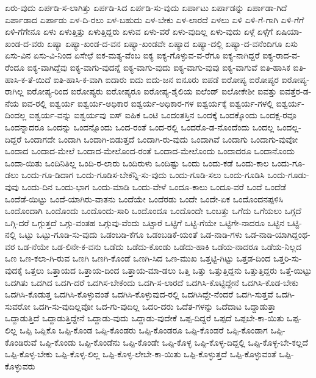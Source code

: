 {ಏರು-ವುದು
ಏರ್ಪಡಿ-ಸ-ಲಾಗಿತ್ತು
ಏರ್ಪಡಿ-ಸಿದ
ಏರ್ಪಡಿ-ಸು-ವುದು
ಏರ್ಪಾಟು
ಏರ್ಪಾಡನ್ನು
ಏರ್ಪಾಡಾ-ಗಿದೆ
ಏರ್ಪಾಡಾದ
ಏರ್ಪಾಡು
ಏಳ-ದಿ-ರಲು
ಏಳ-ಬಹುದು
ಏಳ-ಬೇಕು
ಏಳ-ಲಾರದೆ
ಏಳಲು
ಏಳಿ
ಏಳಿ-ಗೆ-ಗಾಗಿ
ಏಳಿ-ಗೆಗೆ
ಏಳಿ-ಗೆಗೇನೂ
ಏಳು
ಏಳುತ್ತಿತ್ತು
ಏಳುತ್ತಿದ್ದರು
ಏಳುವ
ಏಳು-ವರೆ
ಏಳು-ವುದಿಲ್ಲ
ಏಳು-ವುದು
ಏಳ್ಗೆ
ಏಳ್ಗೆಗೆ
ಏಷಿಯಾ-ಖಂಡ-ದ-ವರು
ಏಷ್ಯಾ
ಏಷ್ಯಾ-ಖಂಡ-ದ-ವನ
ಏಷ್ಯಾ-ಖಂಡವೇ
ಏಷ್ಯಾದ
ಏಷ್ಯಾ-ದಲ್ಲಿ
ಏಷ್ಯಾ-ದ-ವನೆಂದಿಗೂ
ಏಸು
ಏಸು-ವಿನ
ಏಸು-ವಿ-ನಿಂದ
ಏಸೇಛೆ
ಐಕ-ಮತ್ಯ-ವೆಂಬ
ಐಕ್ಯ
ಐಕ್ಯ-ಗೊಳ್ಳುವ-ವ-ರೆಗೂ
ಐಕ್ಯ-ನಾಗಿದ್ದರೆ
ಐಕ್ಯ-ರಾದ-ವ-ರೆಂದೂ
ಐಕ್ಯ-ವಾಗಿದ್ದೆವು
ಐಕ್ಯ-ವಾಗು-ವುದನ್ನೆ
ಐಕ್ಯ-ವಾಗು-ವುದು
ಐಕ್ಯ-ವಾಗು-ವುವು
ಐಕ್ಯ-ವಾಗುವೆ
ಐತಿ-ಹಾಸಿಕ
ಐತಿ-ಹಾಸಿ-ಕ-ತೆ-ಯಿದೆ
ಐತಿ-ಹಾಸಿ-ಕ-ವಾಗಿ
ಐದಾರು
ಐದು
ಐದು-ಜನ
ಐನೂರು
ಐಪಡೆ
ಐರೋಪ್ಯ
ಐರೋಪ್ಯರ
ಐರೋಪ್ಯ-ರಾಗಿಲ್ಲ
ಐರೋಪ್ಯ-ರಿಂದ
ಐರೋಪ್ಯರು
ಐರೋಪ್ಯರೂ
ಐರೋಪ್ಯ-ಶೈಲಿಯ
ಐಲೆಂಡ್
ಐಲೋಕೇಶೀ
ಐವತ್ತು
ಐವತ್ತೆರ-ಡ-ನೆಯ
ಐವ-ರಲ್ಲಿ
ಐಶ್ವರ್ಯ
ಐಶ್ವರ್ಯ-ಅಧಿಕಾರ
ಐಶ್ವರ್ಯ-ಅಧಿಕಾರ-ಗಳ
ಐಶ್ವರ್ಯಕ್ಕೆ
ಐಶ್ವರ್ಯ-ಗಳಲ್ಲಿ
ಐಶ್ವರ್ಯ-ದಿಂದಲ್ಲ
ಐಶ್ವರ್ಯ-ವನ್ನು
ಐಶ್ವರ್ಯವು
ಐಸ್
ಐಹಿಕ
ಒಂಟಿ
ಒಂದಂತಸ್ತಿನ
ಒಂದಕ್ಕೆ
ಒಂದಕ್ಕೊಂದು
ಒಂದಕ್ಷ-ರವೂ
ಒಂದನ್ನಾದರೂ
ಒಂದನ್ನು
ಒಂದನ್ನೊಂದು
ಒಂದ-ರಂತೆ
ಒಂದ-ರಲ್ಲಿ
ಒಂದರೊ-ಡ-ನೊಂದೆಂದು
ಒಂದಲ್ಲ
ಒಂದಲ್ಲ-ದಿದ್ದರೆ
ಒಂದಾಗದೇ
ಒಂದಾಗಿ
ಒಂದಾಗಿ-ಬಿಡುತ್ತದೆ
ಒಂದಾಗಿ-ರು-ವುದು
ಒಂದಾಗಿವೆ
ಒಂದಾಗು
ಒಂದಾಗು-ವುವೋ
ಒಂದಾದ
ಒಂದಾದ-ಮೇಲೆ
ಒಂದಾದ-ಮೇಲೊಂದ-ರಂತೆ
ಒಂದಾದ-ಮೇಲೊಂದು
ಒಂದಾದರೂ
ಒಂದಾನೊಂದು
ಒಂದಾ-ಯಿತು
ಒಂದಿನಿತಿಲ್ಲ
ಒಂದಿ-ರ-ಲಾರು
ಒಂದಿರುಳು
ಒಂದಿಷ್ಟು
ಒಂದು
ಒಂದು-ಕಡೆ
ಒಂದು-ಕಾಲ
ಒಂದು-ಗೂ-ಡಲು
ಒಂದು-ಗೂ-ಡಿದಾಗ
ಒಂದು-ಗೂಡಿಸ-ಬೇಕೆನ್ನಿ-ಸು-ವುದು
ಒಂದು-ಗೂಡಿ-ಸಲು
ಒಂದು-ಗೂಡಿಸಿ
ಒಂದು-ಗೂಡು-ವುವು
ಒಂದು-ದಿನ
ಒಂದು-ಭಾಗ
ಒಂದು-ಮಾಡಿ
ಒಂದು-ವೇಳೆ
ಒಂದೂ-ಕಾಲು
ಒಂದೂ-ವರೆ
ಒಂದೆ
ಒಂದೆಡೆ
ಒಂದೆಡೆ-ಯಿಟ್ಟು
ಒಂದೆ-ಯಾಗಿರು-ವಾತನು
ಒಂದೆಯೇ
ಒಂದೆರಡು
ಒಂದೇ
ಒಂದೇ-ಏಕ
ಒಂದೊಂದನಪ್ಪಳಿಸಿ
ಒಂದೊಂದಾಗಿ
ಒಂದೊಂದು
ಒಂದೊಂದು-ಸಾರಿ
ಒಂದೊಂದೂ
ಒಂದೊಂದೇ
ಒಂಬತ್ತು
ಒಗೆದು
ಒಗೆಯಲು
ಒಗ್ಗದೆ
ಒಗ್ಗಿ-ದರೆ
ಒಗ್ಗುತ್ತದೆ
ಒಗ್ಗು-ವಂತಹ
ಒಗ್ಗುವು-ವೆಂದು
ಒಟ್ಟಾರೆ
ಒಟ್ಟಿಗೆ
ಒಟ್ಟಿ-ಗೆಯೇ
ಒಟ್ಟಿಗೇ-ನಾದರೂ
ಒಟ್ಟಿನ
ಒಟ್ಟಿ-ನಲ್ಲಿ
ಒಟ್ಟು
ಒಟ್ಟು-ಗೂಡಿ-ಸು-ವುದು
ಒಡಂಬಡಿ-ಕೆಗೂ
ಒಡಂಬಡಿಕೆ-ಯಂತೆ
ಒಡ-ನಾಡಿ-ಗಳು
ಒಡ-ನಾಡಿ-ಯಾಗಿದ್ದಂಥ-ವರ
ಒಡ-ನೆಯೇ
ಒಡ-ಲಿನೇ-ಕ-ವನು
ಒಡೆದು
ಒಡೆದು-ಕೊಂಡು
ಒಡೆದು-ಹಾಕಿ
ಒಡೆಯ-ನಾದರೂ
ಒಡೆಯ-ನಿಲ್ಲದ
ಒಣ
ಒಣ-ಕಲಾ-ಗಿ-ರುವ
ಒಣಗಿ
ಒಣಗಿ-ಕೊಂಡೆ
ಒಣಗಿ-ಸಿದ
ಒಣ-ಮುಖ
ಒತ್ತಟ್ಟಿ-ಗಿಟ್ಟು
ಒತ್ತಡ-ದಿಂದ
ಒತ್ತರಿ-ಸು-ವುದಕ್ಕೆ
ಒತ್ತಲು
ಒತ್ತಾಯದ
ಒತ್ತಾಯ-ದಿಂದ
ಒತ್ತಾಯ-ಮಾ-ಡಲು
ಒತ್ತಿ
ಒತ್ತು
ಒತ್ತುತ್ತಿದ್ದನು
ಒತ್ತುತ್ತಿದ್ದರು
ಒತ್ತೆ-ಯಿಟ್ಟು
ಒದಗಿತು
ಒದಗಿದ
ಒದಗಿ-ದರೆ
ಒದಗಿಸ-ಬೇಕೆಂದು
ಒದಗಿ-ಸ-ಲಾರದೆ
ಒದಗಿಸಿ-ಕೊಟ್ಟಿದ್ದೇನೆ
ಒದಗಿಸಿ-ಕೊಡ-ಬೇಕು
ಒದಗಿಸಿ-ಕೊಡುತ್ತ
ಒದಗಿಸಿ-ಕೊಳ್ಳುವಂತೆ
ಒದಗಿಸಿ-ಕೊಳ್ಳುವುದ-ರಲ್ಲಿ
ಒದಗಿಸಿದ್ದೇ-ನೆಂದರೆ
ಒದಗಿ-ಸುತ್ತವೆ
ಒದಗಿ-ಸುವರೋ
ಒದಗಿ-ಸು-ವುದಿಲ್ಲವೋ
ಒದ-ಗು-ವುದಿಲ್ಲ
ಒದರಿ-ದರು
ಒದೆತ-ಗಳನ್ನು
ಒದೆದಾಟ
ಒದ್ದಾಡುತ್ತಾ
ಒದ್ದಾಡುತ್ತಿದೆ
ಒದ್ದಾಡುತ್ತಿದ್ದೇನೆ
ಒದ್ದಾಡು-ವುದು
ಒದ್ದಾಡು-ವುದೇಕೆ
ಒಪ್ಪ-ದಿದ್ದರೆ
ಒಪ್ಪದೆ
ಒಪ್ಪಬೇ-ಕಾ-ಯಿತು
ಒಪ್ಪ-ಲಿಲ್ಲ
ಒಪ್ಪಿ
ಒಪ್ಪಿಕೊ
ಒಪ್ಪಿ-ಕೊಂಡ
ಒಪ್ಪಿ-ಕೊಂಡರು
ಒಪ್ಪಿ-ಕೊಂಡರೂ
ಒಪ್ಪಿ-ಕೊಂಡರೆ
ಒಪ್ಪಿ-ಕೊಂಡಾಗ
ಒಪ್ಪಿ-ಕೊಂಡಿರುವೆ
ಒಪ್ಪಿ-ಕೊಂಡು
ಒಪ್ಪಿ-ಕೊಂಡೆನು
ಒಪ್ಪಿ-ಕೊಂಡೇ
ಒಪ್ಪಿ-ಕೊಳ್ಳ
ಒಪ್ಪಿ-ಕೊಳ್ಳ-ದಿದ್ದಲ್ಲಿ
ಒಪ್ಪಿ-ಕೊಳ್ಳ-ಬೇ-ಕಲ್ಲದೆ
ಒಪ್ಪಿ-ಕೊಳ್ಳ-ಬೇಕು
ಒಪ್ಪಿ-ಕೊಳ್ಳ-ಲಿಲ್ಲ
ಒಪ್ಪಿ-ಕೊಳ್ಳ-ಲೇಬೇ-ಕಾ-ಯಿತು
ಒಪ್ಪಿ-ಕೊಳ್ಳುತ್ತದೆ
ಒಪ್ಪಿ-ಕೊಳ್ಳುವಂತೆ
ಒಪ್ಪಿ-ಕೊಳ್ಳುವರು
}
